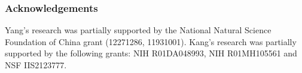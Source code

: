 \subsubsection*{Acknowledgements}


Yang's research was partially supported by the National Natural Science Foundation of China grant (12271286, 11931001). Kang's research was partially supported by the following grants: NIH R01DA048993, NIH R01MH105561 and NSF IIS2123777.